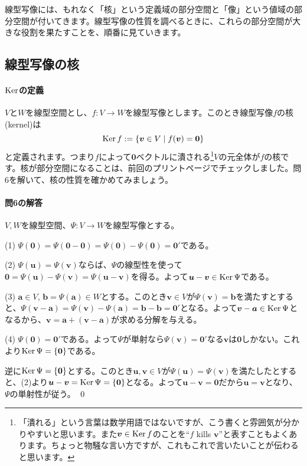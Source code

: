 線型写像には、もれなく「核」という定義域の部分空間と「像」という値域の部分空間が付いてきます。線型写像の性質を調べるときに、これらの部分空間が大きな役割を果たすことを、順番に見ていきます。

\subsection{線型写像の核}

\paragraph{$\operatorname{Ker}$の定義}

$V$と$W$を線型空間とし、$f\colon V\rightarrow W$を線型写像とします。このとき線型写像$f$の核(kernel)は
\[
\operatorname{Ker} f:=\{\boldsymbol{v}\in V\mid f(\boldsymbol{v})=\boldsymbol{0}\}
\]
と定義されます。つまり$f$によって$\bm{0}$ベクトルに潰される\footnote{「潰れる」という言葉は数学用語ではないですが、こう書くと雰囲気が分かりやすいと思います。また$\boldsymbol{v}\in\operatorname{Ker} f$のことを``$f$ kills $\bm{v}$''と表すこともよくあります。ちょっと物騒な言い方ですが、これもこれで言いたいことが伝わると思います。}$V$の元全体が$f$の核です。核が部分空間になることは、前回のプリント\pageref{subsec:kernel}ページでチェックしました。問6を解いて、核の性質を確かめてみましょう。

\paragraph{問6の解答} $V, W$を線型空間、$\Psi\colon V\rightarrow W$を線型写像とする。

\noindent (1) $\Psi(\bm{0}) = \Psi(\bm{0} - \bm{0}) = \Psi(\bm{0}) - \Psi(\bm{0}) = \bm{0}'$である。

\noindent (2) $\Psi(\bm{u}) = \Psi(\bm{v})$ならば、$\Psi$の線型性を使って$\bm{0} = \Psi(\bm{u}) - \Psi(\bm{v}) = \Psi(\bm{u} - \bm{v})$を得る。よって$\boldsymbol{u} - \boldsymbol{v} \in \operatorname{Ker}\Psi$である。

\noindent (3) $\bm{a}\in V$, $\bm{b} = \Psi(\bm{a})\in W$とする。このとき$\bm{v}\in V$が$\Psi(\bm{v}) = \bm{b}$を満たすとすると、$\Psi(\bm{v} - \bm{a}) = \Psi(\bm{v}) - \Psi(\bm{a}) = \bm{b} - \bm{b} = \bm{0}'$となる。よって$\boldsymbol{v} - \boldsymbol{a} \in \operatorname{Ker}\Psi$となるから、$\bm{v} = \bm{a} + (\bm{v} - \bm{a})$が求める分解を与える。

\noindent (4) $\Psi(\bm{0}) = \bm{0}'$である。よって$\Psi$が単射なら$\Psi(\bm{v}) = \bm{0}'$なる$\bm{v}$は$\bm{0}$しかない。これより$\operatorname{Ker}\Psi=\{\boldsymbol{0}\}$である。

逆に$\operatorname{Ker}\Psi = \{\boldsymbol{0}\}$とする。このとき$\bm{u}, \bm{v}\in V$が$\Psi(\bm{u}) = \Psi(\bm{v})$を満たしたとすると、(2)より$\boldsymbol{u} - \boldsymbol{v} = \operatorname{Ker}\Psi = \{\boldsymbol{0}\}$となる。よって$\bm{u} - \bm{v} = \bm{0}$だから$\bm{u} = \bm{v}$となり、$\Psi$の単射性が従う。 \qed

